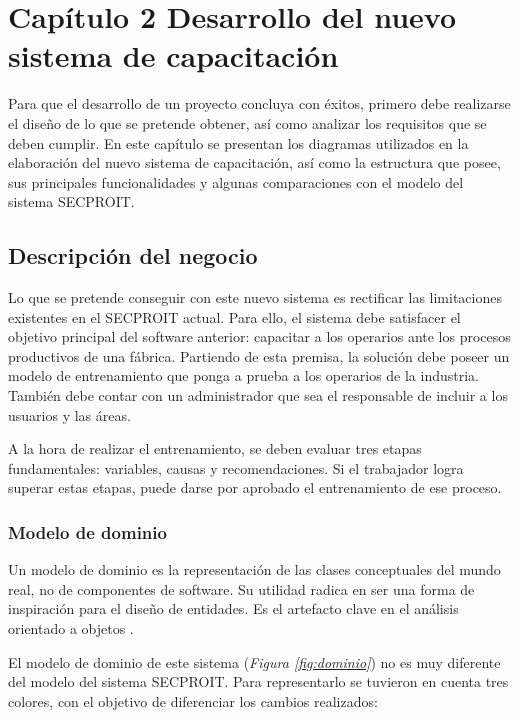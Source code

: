 \chapter*{Capítulo 2 \vspace{0.5cm} \break Desarrollo del nuevo sistema de capacitación}
\setcounter{chapter}{2}
\setcounter{section}{0}

Para que el desarrollo de un proyecto concluya con éxitos, primero debe realizarse el diseño de lo que se pretende obtener, así como analizar los requisitos que se deben cumplir. En este capítulo se presentan los diagramas utilizados en la elaboración del nuevo sistema de capacitación, así como la estructura que posee, sus principales funcionalidades y algunas comparaciones con el modelo del sistema SECPROIT.

\section{Descripción del negocio}
Lo que se pretende conseguir con este nuevo sistema es rectificar las limitaciones existentes en el SECPROIT actual. Para ello, el sistema debe satisfacer el objetivo principal del software anterior: capacitar a los operarios ante los procesos productivos de una fábrica.
Partiendo de esta premisa, la solución debe poseer un modelo de entrenamiento que ponga a prueba a los operarios de la industria. También debe contar con un administrador que sea el responsable de incluir a los usuarios y las áreas.

A la hora de realizar el entrenamiento, se deben evaluar tres etapas fundamentales: variables, causas y recomendaciones. Si el trabajador logra superar estas etapas, puede darse por aprobado el entrenamiento de ese proceso.

\subsection{Modelo de dominio}
Un modelo de dominio es la representación de las clases conceptuales del mundo real, no de componentes de software. Su utilidad radica en ser una forma de inspiración para el diseño de entidades. Es el artefacto clave en el análisis orientado a objetos \cite{Herchi2012}.

El modelo de dominio de este sistema (\textsl{Figura \ref{fig:dominio}}) no es muy diferente del modelo del sistema SECPROIT. Para representarlo se tuvieron en cuenta tres colores, con el objetivo de diferenciar los cambios realizados:


